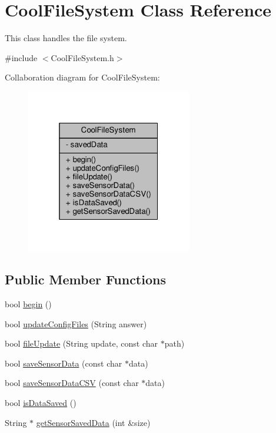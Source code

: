 \hypertarget{classCoolFileSystem}{}\section{Cool\+File\+System Class Reference}
\label{classCoolFileSystem}


This class handles the file system.  




{\ttfamily \#include $<$Cool\+File\+System.\+h$>$}



Collaboration diagram for Cool\+File\+System\+:\nopagebreak
\begin{figure}[H]
\begin{center}
\leavevmode
\includegraphics[width=205pt]{classCoolFileSystem__coll__graph}
\end{center}
\end{figure}
\subsection*{Public Member Functions}
\begin{DoxyCompactItemize}
\item 
bool \hyperlink{classCoolFileSystem_a6ba6f666ed4c530174f8569d2c636748}{begin} ()
\item 
bool \hyperlink{classCoolFileSystem_adfa8e2e80641ae6f0cceabd348a9b841}{update\+Config\+Files} (String answer)
\item 
bool \hyperlink{classCoolFileSystem_a13f2958f5b87757c31fc53797a30d23a}{file\+Update} (String update, const char $\ast$path)
\item 
bool \hyperlink{classCoolFileSystem_afa3a4feae94871d4d3b6bebb701c2e67}{save\+Sensor\+Data} (const char $\ast$data)
\item 
bool \hyperlink{classCoolFileSystem_ab78704d5d21ce10fc6f1138ab5ab46c8}{save\+Sensor\+Data\+C\+SV} (const char $\ast$data)
\item 
bool \hyperlink{classCoolFileSystem_a5a7eaeea7a9fbf8aaef651d862fa3b5b}{is\+Data\+Saved} ()
\item 
String $\ast$ \hyperlink{classCoolFileSystem_a3223ffff4266a6300988fab956d6b4b2}{get\+Sensor\+Saved\+Data} (int \&size)
\end{DoxyCompactItemize}
